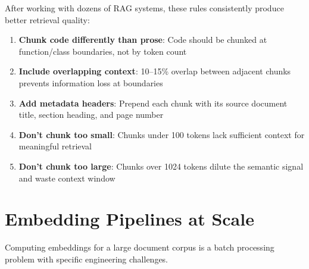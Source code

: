 \begin{tipbox}
After working with dozens of RAG systems, these rules consistently produce better retrieval quality:
\begin{enumerate}
    \item \textbf{Chunk code differently than prose}: Code should be chunked at function/class boundaries, not by token count
    \item \textbf{Include overlapping context}: 10--15\% overlap between adjacent chunks prevents information loss at boundaries
    \item \textbf{Add metadata headers}: Prepend each chunk with its source document title, section heading, and page number
    \item \textbf{Don't chunk too small}: Chunks under 100 tokens lack sufficient context for meaningful retrieval
    \item \textbf{Don't chunk too large}: Chunks over 1024 tokens dilute the semantic signal and waste context window
\end{enumerate}
\end{tipbox}

\section{Embedding Pipelines at Scale}

Computing embeddings for a large document corpus is a batch processing problem with specific engineering challenges.

